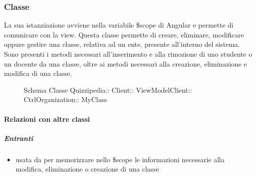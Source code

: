 \subsubsection{Classe }
La sua istanziazione avviene nella variabile \$scope di Angular e permette di comunicare con la view. Questa classe permette di creare, eliminare, modificare oppure gestire una classe, relativa ad un ente, presente all'interno del sistema.
Sono presenti i metodi necessari all'inserimento e alla rimozione di uno studente o un docente da una classe, oltre ai metodi necessari alla creazione, eliminazione e modifica di una classe.
\begin{figure}[H]
\centering
\noindent{}
\caption[Schema Classe MyClass]{Schema Classe Quizzipedia:: Client:: ViewModelClient:: CtrlOrganization:: MyClass}
\end{figure}
\paragraph{Relazioni con altre classi}
\subparagraph{Entranti}
\begin{itemize}
\item usata da  per memorizzare nello \$scope le informazioni necessarie alla modifica, eliminazione o creazione di una classe
\end{itemize}
